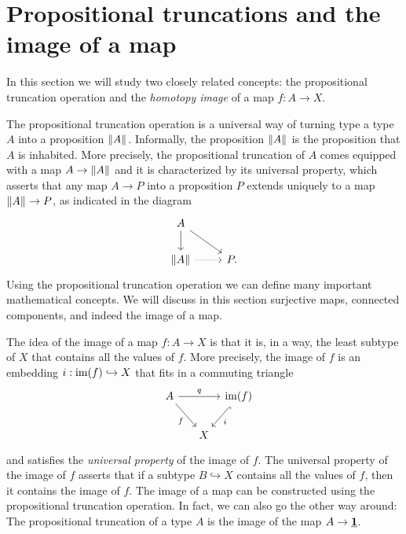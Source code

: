 \section{Propositional truncations and the image of a map}\label{chap:image}

In this section we will study two closely related concepts: the propositional truncation operation and the \emph{homotopy image} of a map $f:A\to X$. 

The propositional truncation operation is a universal way of turning type a type $A$ into a proposition $\Vert A\Vert_{}$. Informally, the proposition $\Vert A\Vert_{}$ is the proposition that $A$ is inhabited. More precisely, the propositional truncation of $A$ comes equipped with a map $A\to\Vert A\Vert_{}$ and it is characterized by its universal property, which asserts that any map $A\to P$ into a proposition $P$ extends uniquely to a map $\Vert A\Vert_{}\to P$, as indicated in the diagram
\begin{equation*}
  \begin{tikzcd}
    A \arrow[dr] \arrow[d] \\
    \brck{A} \arrow[r,densely dotted] & P.
  \end{tikzcd}
\end{equation*}
Using the propositional truncation operation we can define many important mathematical concepts. We will discuss in this section surjective maps, connected components, and indeed the image of a map.

The idea of the image of a map $f:A\to X$ is that it is, in a way, the least subtype of $X$ that contains all the values of $f$. More precisely, the image of $f$ is an embedding $i:\operatorname{im}(f)\hookrightarrow X$ that fits in a commuting triangle
\begin{equation*}
  \begin{tikzcd}[column sep=tiny]
    A \arrow[rr,"q"] \arrow[dr,swap,"f"] & & \im(f) \arrow[dl,hook,"i"] \\
    \phantom{\im(f)} & X
  \end{tikzcd}
\end{equation*}
and satisfies the \emph{universal property} of the image of $f$. The universal property of the image of $f$ asserts that if a subtype $B\hookrightarrow X$ contains all the values of $f$, then it contains the image of $f$.
The image of a map can be constructed using the propositional truncation operation. In fact, we can also go the other way around: The propositional truncation of a type $A$ is the image of the map $A\to\underline{\mathbf{1}}$.

